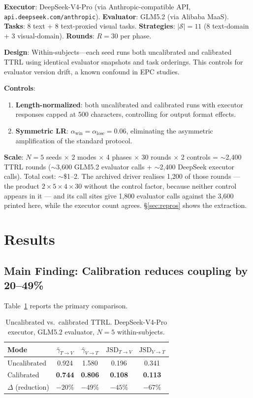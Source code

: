 \documentclass[11pt]{article}
\begin{document}
\textbf{Executor}: DeepSeek-V4-Pro (via Anthropic-compatible API, \texttt{api.deepseek.com/anthropic}). \textbf{Evaluator}: GLM5.2 (via Alibaba MaaS). \textbf{Tasks}: 8 text + 8 text-proxied visual tasks. \textbf{Strategies}: $|\mathcal{S}|{=}11$ (8 text-domain + 3 visual-domain). \textbf{Rounds}: $R{=}30$ per phase.

\textbf{Design}: Within-subjects---each seed runs both uncalibrated and calibrated TTRL using identical evaluator snapshots and task orderings. This controls for evaluator version drift, a known confound in EPC studies.

\textbf{Controls}:
\begin{enumerate}[leftmargin=*,nosep]
 \item \textbf{Length-normalized}: both uncalibrated and calibrated runs with executor responses capped at 500 characters, controlling for output format effects.
 \item \textbf{Symmetric LR}: $\alpha_{\text{win}}{=}\alpha_{\text{lose}}{=}0.06$, eliminating the asymmetric amplification of the standard protocol.
\end{enumerate}

\textbf{Scale}: $N{=}5$ seeds $\times$ 2 modes $\times$ 4 phases $\times$ 30 rounds $\times$ 2 controls = $\sim$2,400 TTRL rounds ($\sim$3,600 GLM5.2 evaluator calls + $\sim$2,400 DeepSeek executor calls). Total cost: $\sim$\$1--2. The archived driver realises 1,200 of those rounds --- the product $2\times 5\times 4\times 30$ without the control factor, because neither control appears in it --- and its call sites give 1,800 evaluator calls against the 3,600 printed here, while the executor count agrees. \S\ref{sec:repros} shows the extraction.

\section{Results}

\subsection{Main Finding: Calibration reduces coupling by 20--49\%}

Table~\ref{tab:main} reports the primary comparison.

\begin{table}[H]
\centering
\caption{Uncalibrated vs.\ calibrated TTRL. DeepSeek-V4-Pro executor, GLM5.2 evaluator, $N{=}5$ within-subjects.}
\label{tab:main}
\begin{tabular}{@{}lcccc@{}}
\toprule
\textbf{Mode} & $\bar{\gamma}_{T{\to}V}$ & $\bar{\gamma}_{V{\to}T}$ & $\text{JSD}_{T{\to}V}$ & $\text{JSD}_{V{\to}T}$ \\
\midrule
Uncalibrated & 0.924 & 1.580 & 0.196 & 0.341 \\
Calibrated   & \textbf{0.744} & \textbf{0.806} & \textbf{0.108} & \textbf{0.113} \\
\midrule
$\Delta$ (reduction) & ${-}20\%$ & ${-}49\%$ & ${-}45\%$ & ${-}67\%$ \\
\bottomrule
\end{tabular}
\end{table}
\end{document}
